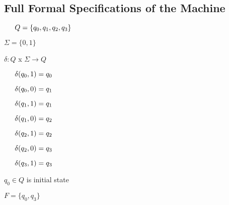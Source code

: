 \documentclass[12pt]{article}
\begin{document}
\subsection{Full Formal Specifications of the Machine}

$ \indent Q = \{q_{0},q_{1},q_{2},q_{3}\}$

$ \Sigma = \{0,1\}$

$ \delta : Q$ x $\Sigma \rightarrow Q $

$ \indent  \delta(q_{0},1) = q_{0}$

$\indent   \delta(q_{0},0) = q_{1}$

$\indent   \delta(q_{1},1) = q_{1}$

$\indent   \delta(q_{1},0) = q_{2}$

$\indent   \delta(q_{2},1) = q_{2}$

$\indent   \delta(q_{2},0) = q_{3}$

$\indent   \delta(q_{3},1) = q_{3}$

$q_{0} \in Q$ is initial state

$ F = \{q_{0},q_{3}\} $
\end{document}

